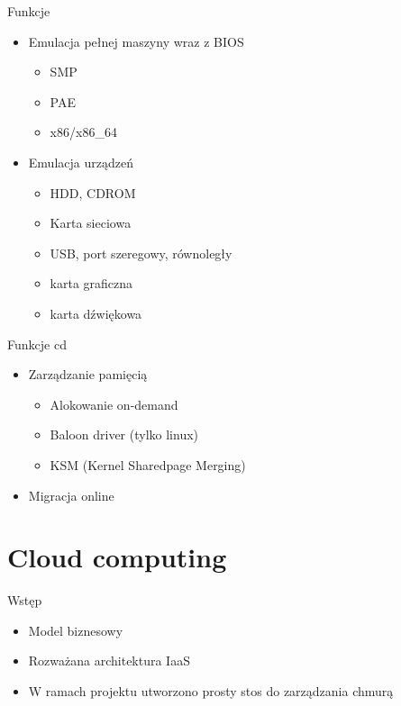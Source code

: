 \documentclass{beamer}
\begin{document}
\begin{frame}{Funkcje}
  \begin{itemize}
    \item Emulacja pełnej maszyny wraz z BIOS
      \begin{itemize}
        \item SMP
        \item PAE
        \item x86/x86\_64
      \end{itemize}
    \item Emulacja urządzeń
      \begin{itemize}
        \item HDD, CDROM
        \item Karta sieciowa
        \item USB, port szeregowy, równoległy
        \item karta graficzna
        \item karta dźwiękowa
      \end{itemize}
  \end{itemize}
\end{frame}

\begin{frame}{Funkcje cd}
  \begin{itemize}
    \item Zarządzanie pamięcią
      \begin{itemize}
        \item Alokowanie on-demand
        \item Baloon driver (tylko linux)
        \item KSM (Kernel Sharedpage Merging)
      \end{itemize}
    \item Migracja online
  \end{itemize}
\end{frame}


\section{Cloud computing}
\begin{frame}{Wstęp}
  \begin{itemize}
    \item Model biznesowy
    \item Rozważana architektura IaaS
    \item W ramach projektu utworzono prosty stos do zarządzania chmurą
  \end{itemize}
\end{frame}
\end{document}
